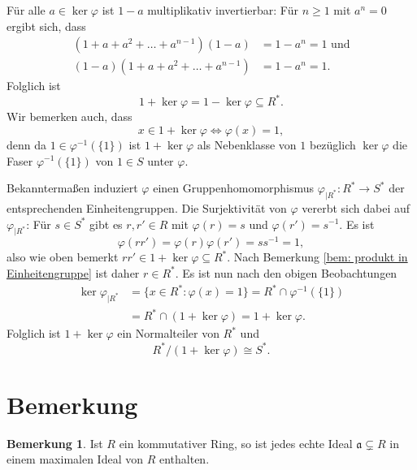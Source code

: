 \documentclass[a4paper,10pt]{article}
\newcounter{satze}
\theoremstyle{definition}
\newtheorem{bem}[satze]{Bemerkung}
\newcommand{\mf}[1]{\mathfrak{#1}}
\begin{document}
Für alle $a \in \ker \varphi$ ist $1-a$ multiplikativ invertierbar: Für $n \geq 1$ mit $a^n = 0$ ergibt sich, dass
\begin{align*}
 (1+a+a^2+\ldots+a^{n-1})(1-a) &= 1-a^n = 1 \text{ und} \\
 (1-a)(1+a+a^2+\ldots+a^{n-1}) &= 1-a^n = 1.
\end{align*}
Folglich ist
\[
 1 + \ker \varphi = 1 - \ker \varphi \subseteq R^*.
\]
Wir bemerken auch, dass
\[
 x \in 1 + \ker \varphi \Leftrightarrow \varphi(x) = 1,
\]
denn da $1 \in \varphi^{-1}(\{1\})$ ist $1 + \ker \varphi$ als Nebenklasse von $1$ bezüglich $\ker \varphi$ die Faser $\varphi^{-1}(\{1\})$ von $1 \in S$ unter $\varphi$.

Bekanntermaßen induziert $\varphi$ einen Gruppenhomomorphismus $\varphi_{|R^*} : R^* \rightarrow S^*$ der entsprechenden Einheitengruppen. Die Surjektivität von $\varphi$ vererbt sich dabei auf $\varphi_{|R^*}$: Für $s\in S^*$ gibt es $r,r' \in R$ mit $\varphi(r) = s$ und $\varphi(r') = s^{-1}$. Es ist
\[
 \varphi(r r') = \varphi(r) \varphi(r') = s s^{-1} = 1,
\]
also wie oben bemerkt $r r' \in 1 + \ker \varphi \subseteq R^*$. Nach Bemerkung \ref{bem: produkt in Einheitengruppe} ist daher $r \in R^*$. Es ist nun nach den obigen Beobachtungen
\begin{align*}
 \ker \varphi_{|R^*}
 &= \{x \in R^* : \varphi(x) = 1\}
 = R^* \cap \varphi^{-1}(\{1\}) \\
 &= R^* \cap (1+ \ker \varphi)
 = 1 + \ker \varphi.
\end{align*}
Folglich ist $1 + \ker \varphi$ ein Normalteiler von $R^*$ und
\[
 R^* / (1+ \ker \varphi) \cong S^*.
\]





\section*{Bemerkung}

\begin{bem} \label{bem: alle in max}
 Ist $R$ ein kommutativer Ring, so ist jedes echte Ideal $\mf{a} \subsetneq R$ in einem maximalen Ideal von $R$ enthalten.
\end{bem}
\end{document}
